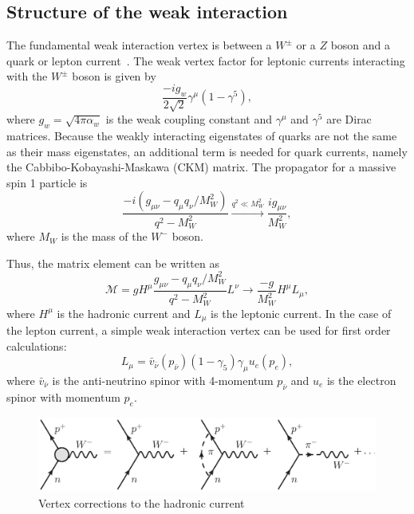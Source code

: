 \documentclass[oneside,12pt]{memoir}
\begin{document}
\subsection{Structure of the weak interaction}
\label{sec:weak_struct}
The fundamental weak interaction vertex is between a $W^{\pm}$ or a $Z$ boson and a quark or lepton current~\cite{griffiths87}. The weak vertex factor for leptonic currents interacting with the $W^{\pm}$ boson is given by
\begin{equation}
	\label{eq:weakvertex}
	\frac{-ig_{w}}{2\sqrt{2}}\gamma^{\mu}\left(1-\gamma^5\right),
\end{equation}
where $g_w=\sqrt{4\pi\alpha_w}$ is the weak coupling constant and $\gamma^\mu$ and $\gamma^5$ are Dirac matrices. Because the weakly interacting eigenstates of quarks are not the same as their mass eigenstates, an additional term is needed for quark currents, namely the Cabbibo-Kobayashi-Maskawa (CKM) matrix. The propagator for a massive spin 1 particle is
\begin{equation}
	\label{eq:weakprop}
	\frac{-i\left(g_{\mu\nu}-q_\mu q_\nu/M_W^2\right)}
		{q^2-M_W^2}
	\xrightarrow{q^2\ll M_W^2} \frac{ig_{\mu\nu}}{M_W^2},
\end{equation}
where $M_W$ is the mass of the $W^{-}$ boson.\par
Thus, the matrix element can be written as
\begin{equation}
	\mathcal{M}=gH^\mu\frac{g_{\mu\nu}-q_\mu q_\nu/M_W^2}
		{q^2-M_W^2}L^\nu
		\longrightarrow\frac{-g}{M^2_W}H^\mu L_\mu,
	\label{eq:matrix_element}
\end{equation}
where $H^\mu$ is the hadronic current and $L_\mu$ is the leptonic current. In the case of the lepton current, a simple weak interaction vertex can be used for first order calculations:
\begin{equation}
	L_\mu=\bar{v}_{\bar{\nu}}\left(p_{\bar{\nu}}\right)
		\left(1-\gamma_5\right)\gamma_\mu u_e\left(p_e\right),
	\label{eq:lepton_current}
\end{equation}
where $\bar{v}_{\bar{\nu}}$ is the anti-neutrino spinor with 4-momentum $p_{\bar{\nu}}$ and $u_e$ is the electron spinor with momentum $p_e$.\par
\begin{figure}[b]
	\includegraphics[width=\textwidth]{vertex_corrections.eps}
	\caption[Vertex corrections to the hadronic current]{Vertex corrections to the hadronic current}
	\label{fig:hadron_vertex}
\end{figure}
\end{document}
